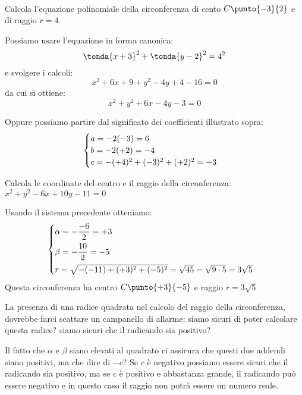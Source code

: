 \begin{esempio}
~

\noindent\begin{minipage}{.55\textwidth}
Calcola l'equazione polinomiale della circonferenza di cento \(C\punto{-3}{2}\) 
e di raggio \(r=4\).

Possiamo usare l'equazione in forma canonica:
\[\tonda{x+3}^2 + \tonda{y-2}^2 = 4^2\]
e svolgere i calcoli:
\[x^2 +6x+9 +y^2 -4y +4 -16 = 0\]
da cui si ottiene:
\[x^2 +y^2 +6x -4y -3 = 0\]
\end{minipage}
\hfill
\begin{minipage}{.43\textwidth}
\begin{center}
\begin{inaccessibleblock}
  \circtraslata
\end{inaccessibleblock}
\end{center}
\end{minipage}
Oppure possiamo partire dal significato dei coefficienti illustrato sopra:
\[\begin{cases}a = -2(-3)=6 \\ b = -2(+2)=-4 \\ c = -(+4)^2 +(-3)^2 +(+2)^2=-3\end{cases}\]
\end{esempio}

\begin{esempio}
Calcola le coordinate del centro e il raggio della circonferenza:
\(x^2 +y^2 -6x + 10y -11 = 0\)

Usando il sistema precedente otteniamo:
\[\begin{cases}\alpha = -\dfrac{-6}{2} = +3\\[7pt] 
           \beta = -\dfrac{10}{2} = -5 \\[7pt] 
           r = \sqrt{-(-11) +(+3)^2 + (-5)^2} = \sqrt{45}= 
               \sqrt{9 \cdot 5} = 3\sqrt{5}\end{cases}\]
Questa circonferenza ha centro \(C\punto{+3}{-5}\) e raggio \(r=3\sqrt{5}\)
\end{esempio}

\begin{osservazione}
La presenza di una radice quadrata nel calcolo del raggio della circonferenza, 
dovrebbe farci scattare un campanello di allarme: siamo sicuri di poter 
calcolare questa radice? siamo sicuri che il radicando sia positivo?

Il fatto che \(\alpha\) e \(\beta\) siano elevati al quadrato ci assicura che 
questi due addendi siano positivi, ma che dire di \(-c\)? Se \(c\) è negativo 
possiamo essere sicuri che il radicando sia positivo, ma se \(c\) è positivo e 
abbastanza grande, il radicando può essere negativo e in questo caso il raggio 
non potrà essere un numero reale.
\end{osservazione}

